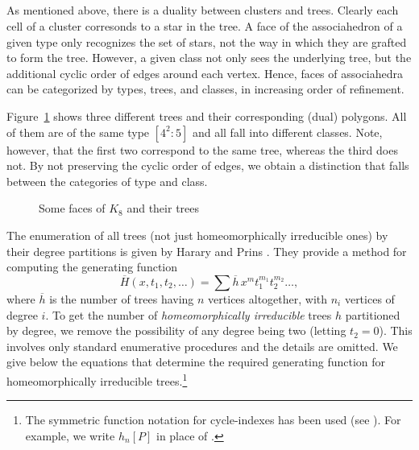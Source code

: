 \documentclass[10pt]{amsart}
\begin{document}
    \subsection{}  As mentioned above, there is a duality between clusters and trees.  Clearly each cell of a cluster corresonds to a star in the tree. A face of the associahedron of a given type only recognizes the set of stars, not the way in which they are grafted to form the tree. However, a given class not only sees the underlying tree, but the additional cyclic order of edges around each vertex. Hence, faces of associahedra can be categorized by types, trees, and classes, in increasing order of refinement.
    
    \begin{exmp}
    Figure~\ref{phylo} shows three different trees and their corresponding (dual) polygons.  All of them are of the same type $[4^2 : 5]$ and all fall into different classes.  Note, however, that the first two correspond to the same tree, whereas the third does not.  By not preserving the cyclic order of edges, we obtain a distinction that falls between the categories of type and class.
    \end{exmp}
    
    \begin{figure}[h]
    \caption{Some faces of $K_8$ and their trees}
    \label{phylo}
    \end{figure}
    
    The enumeration of all trees (not just homeomorphically irreducible ones) by their degree partitions is given by Harary and Prins \cite[\S4]{hpr}.  They provide a method for computing the generating function
    $$\overline{H}(x, t_1, t_2, \ldots) = \sum \overline{h} \, x^m t_1^{m_1} t_2^{m_2} \ldots,$$
    where $\overline{h}$ is the number of trees having $n$ vertices altogether, with $n_i$ vertices of degree $i$.  To get the number of {\em homeomorphically irreducible} trees $h$ partitioned by degree, we remove the possibility of any degree being two (letting $t_2=0$). This involves only standard enumerative procedures and the details are omitted.  We give below the equations that determine the required generating function for homeomorphically irreducible trees.\footnote{The symmetric function notation for cycle-indexes has been used (see \cite{r0}). For example, we write $h_n[P]$ in place of .}
  
\end{document}
